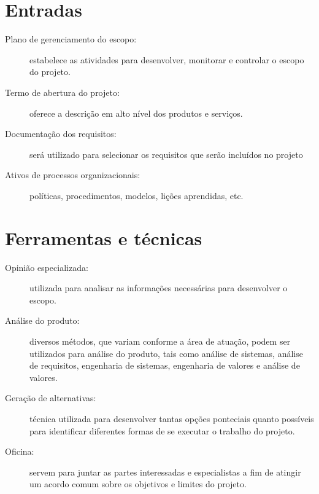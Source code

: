 \section{Entradas}

\begin{description}
	
	\item[Plano de gerenciamento do escopo:] estabelece as atividades para desenvolver, monitorar e controlar o escopo do projeto.
	
	\item[Termo de abertura do projeto:] oferece a descrição em alto nível dos produtos e serviços.
	
	\item[Documentação dos requisitos:] será utilizado para selecionar os requisitos que serão incluídos no projeto
	
	\item[Ativos de processos organizacionais:] políticas, procedimentos, modelos, lições aprendidas, etc.
	
\end{description}

\section{Ferramentas e técnicas}

\begin{description}

	\item[Opinião especializada:] utilizada para analisar as informações necessárias para desenvolver o escopo.
	
	\item[Análise do produto:] diversos métodos, que variam conforme a área de atuação, podem ser utilizados para análise do produto, tais como análise de sistemas, análise de requisitos, engenharia de sistemas, engenharia de valores e análise de valores.
	
	\item[Geração de alternativas:] técnica utilizada para desenvolver tantas opções ponteciais quanto possíveis para identificar diferentes formas de se executar o trabalho do projeto.
	
	\item[Oficina:] servem para juntar as partes interessadas e especialistas a fim de atingir um acordo comum sobre os objetivos e limites do projeto.
	
\end{description}

